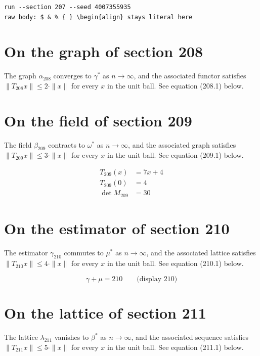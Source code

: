 \documentclass{article}
\begin{document}
\begin{verbatim}
run --section 207 --seed 4007355935
raw body: $ & % { } \begin{align} stays literal here
\end{verbatim}

\section{On the graph of section 208}
The graph $\alpha_{208}$ converges to $\gamma^{*}$ as $n \to \infty$,
and the associated functor satisfies $\|T_{208} x\| \leq 2 \cdot \|x\|$
for every $x$ in the unit ball. See equation (208.1) below.

\section{On the field of section 209}
The field $\beta_{209}$ contracts to $\omega^{*}$ as $n \to \infty$,
and the associated graph satisfies $\|T_{209} x\| \leq 3 \cdot \|x\|$
for every $x$ in the unit ball. See equation (209.1) below.

\begin{align}
T_{209}(x) &= 7 x + 4 \\
T_{209}(0) &= 4 \\
\det M_{209} &= 30
\end{align}

\section{On the estimator of section 210}
The estimator $\gamma_{210}$ commutes to $\mu^{*}$ as $n \to \infty$,
and the associated lattice satisfies $\|T_{210} x\| \leq 4 \cdot \|x\|$
for every $x$ in the unit ball. See equation (210.1) below.

$$
\gamma + \mu = 210 \qquad \text{(display 210)}
$$

\section{On the lattice of section 211}
The lattice $\lambda_{211}$ vanishes to $\beta^{*}$ as $n \to \infty$,
and the associated sequence satisfies $\|T_{211} x\| \leq 5 \cdot \|x\|$
for every $x$ in the unit ball. See equation (211.1) below.
\end{document}
